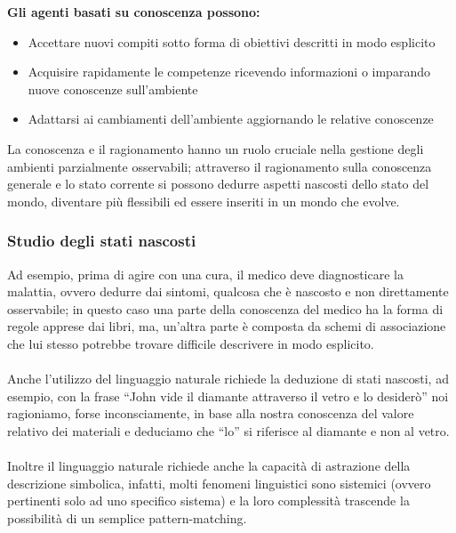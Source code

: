 \documentclass[../main.tex]{subfiles}
\begin{document}
	\textbf{Gli agenti basati su conoscenza possono:}
	\begin{itemize}
		\item Accettare nuovi compiti sotto forma di obiettivi descritti in modo esplicito
		\item Acquisire rapidamente le competenze ricevendo informazioni o imparando nuove conoscenze sull'ambiente
		\item Adattarsi ai cambiamenti dell'ambiente aggiornando le relative conoscenze
	\end{itemize}
	La conoscenza e il ragionamento hanno un ruolo cruciale nella gestione degli ambienti parzialmente osservabili; attraverso il ragionamento sulla conoscenza generale e lo stato corrente si possono dedurre aspetti nascosti dello stato del mondo, diventare più flessibili ed essere inseriti in un mondo che evolve.
	\subsubsection{Studio degli stati nascosti}
	Ad esempio, prima di agire con una cura, il medico deve diagnosticare la malattia, ovvero dedurre dai sintomi, qualcosa che è nascosto e non direttamente osservabile; in questo caso una parte della conoscenza del medico ha la forma di regole apprese dai libri, ma, un'altra parte è composta da schemi di associazione che lui stesso potrebbe trovare difficile descrivere in modo esplicito.\\\\
	Anche l’utilizzo del linguaggio naturale richiede la deduzione di stati nascosti, ad esempio, con la frase “John vide il diamante attraverso il vetro e lo desiderò” noi ragioniamo, forse inconsciamente, in base alla nostra conoscenza del valore relativo dei materiali e deduciamo che “lo” si riferisce al diamante e non al vetro.\\\\
	Inoltre il linguaggio naturale richiede anche la capacità di astrazione della descrizione simbolica, infatti, molti fenomeni linguistici sono sistemici (ovvero pertinenti solo ad uno specifico sistema) e la loro complessità trascende la possibilità di un semplice pattern-matching.
\end{document}
